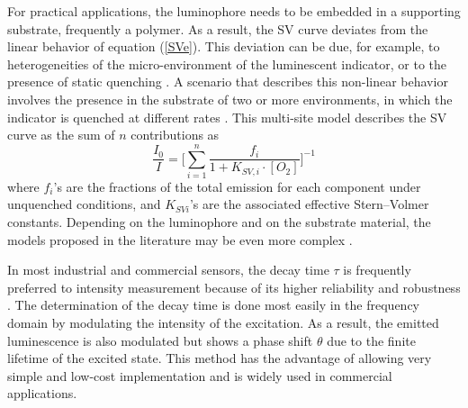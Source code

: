 \documentclass[9pt,twocolumn,twoside,pdftex]{optica}
\begin{document}
For practical applications, the luminophore needs to be embedded in a supporting substrate, frequently a polymer. As a result, the SV curve deviates from the linear behavior of equation (\ref{SVe}). This deviation can be due, for example, to heterogeneities of the micro-environment of the luminescent indicator, or to the presence of static quenching \cite{Wang2014}. A scenario that describes this non-linear behavior involves the presence in the substrate of two or more environments, in which the indicator is quenched at different rates \cite{Carraway1991,Demas1995}. This multi-site model describes the SV curve as the sum of $n$ contributions as
\begin{equation}
\frac{I_0}{I}=\bigg[ \sum_{i=1}^n
\frac{f_i}{1+K_{SV,i} \cdot \left[O_2\right]}
\bigg]^{-1}
\label{SVe2}
\end{equation}
where $f_i$'s are the fractions of the total emission for each component under unquenched conditions, and $K_{SVi}$'s are the associated effective Stern–Volmer constants. Depending on the luminophore and on the substrate material, the models proposed in the literature may be even more complex \cite{Demas1995,Hartmann1995,Mills1999}.

In most industrial and commercial sensors, the decay time $\tau$ is frequently preferred to intensity measurement because of its higher reliability and robustness \cite{Wei2019}. The determination of the decay time is done most easily in the frequency domain by modulating the intensity of the excitation.  As a result, the emitted luminescence is also modulated but shows a phase shift $\theta$ due to the finite lifetime of the excited state. This method has the advantage of allowing very simple and low-cost implementation and is widely used in commercial applications.
\end{document}

